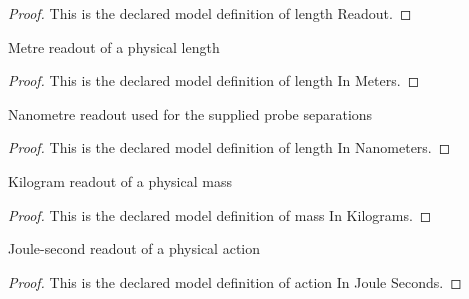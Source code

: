 \begin{proof}
  This is the declared model definition of length Readout.
\end{proof}
\begin{definition}
  \label{def:physics:phyx-mini-0584:phyxminiproblems-problemphyxmini0584-lengthinmeters}
  Metre readout of a physical length
\end{definition}
\begin{proof}
  This is the declared model definition of length In Meters.
\end{proof}
\begin{definition}
  \label{def:physics:phyx-mini-0584:phyxminiproblems-problemphyxmini0584-lengthinnanometers}
  Nanometre readout used for the supplied probe separations
\end{definition}
\begin{proof}
  This is the declared model definition of length In Nanometers.
\end{proof}
\begin{definition}
  \label{def:physics:phyx-mini-0584:phyxminiproblems-problemphyxmini0584-massinkilograms}
  Kilogram readout of a physical mass
\end{definition}
\begin{proof}
  This is the declared model definition of mass In Kilograms.
\end{proof}
\begin{definition}
  \label{def:physics:phyx-mini-0584:phyxminiproblems-problemphyxmini0584-actioninjouleseconds}
  Joule-second readout of a physical action
\end{definition}
\begin{proof}
  This is the declared model definition of action In Joule Seconds.
\end{proof}
